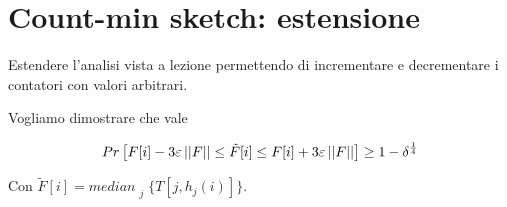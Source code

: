 \chapter{Count-min sketch: estensione}

\begin{problem*}
    Estendere l'analisi vista a lezione permettendo di incrementare e decrementare
    i contatori con valori arbitrari.
\end{problem*}

Vogliamo dimostrare che vale

\[
    Pr\left[F[i] - 3\varepsilon\left|\left|F\right|\right| \le \tilde{F}[i]
        \le F[i] + 3\varepsilon\left|\left|F\right|\right|\right] \ge 1 - \delta^{\frac{1}{4}}
\]

Con $\tilde{F}[i] = median_{\substack{j}}\{T[j, h_j(i)]\}$.

